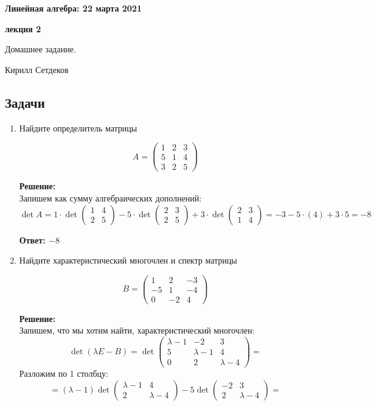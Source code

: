 \documentclass[a4paper,12pt]{article}
\newcounter{z}
\renewcommand{\date}{{\bf 22 марта 2021}}
\newcommand{\HSEhat}{
\vspace*{-0pt}
\noindent
\setcounter{z}{0}


{\bf \phantom{\date}  \large \hfill Линейная алгебра: \hfill \normalsize \date}

\vspace{5 pt}
{\bf \large \hfill  лекция 2\hfill }

\vspace{15 pt}
\centerline{ \large  Домашнее задание.}
\centerline{ \large  Кирилл Сетдеков}



\vspace*{10pt}
\setcounter{z}{0}

}
\begin{document}
\HSEhat


\subsection*{Задачи}

\begin{enumerate}

\item  Найдите определитель матрицы

$$A=
\begin{pmatrix}
1&2&3\\
5&1&4\\
3&2&5
\end{pmatrix}
$$

\vspace{5pt}
\textbf{Решение:}\\
Запишем как сумму алгебраических дополнений:
$$\det A = 1\cdot\det \begin{pmatrix}
1&4\\
2&5
\end{pmatrix}-5\cdot\det \begin{pmatrix}
2&3\\
2&5
\end{pmatrix}+3\cdot\det \begin{pmatrix}
2&3\\
1&4
\end{pmatrix} = -3-5\cdot(4)+3\cdot5=-8$$

\textbf{Ответ: $-8$}


\item  Найдите характеристический многочлен и спектр матрицы 

$$B=
\begin{pmatrix}
1 & 2 & -3\\
-5 & 1 & -4\\
0 & -2 & 4
\end{pmatrix}
$$

\vspace{5pt}
\textbf{Решение:}\\
Запишем, что мы хотим найти, характеристический многочлен:
$$\det(\lambda E - B)= \det \begin{pmatrix}
\lambda - 1 & -2 & 3\\
5 & \lambda -1 & 4\\
0 & 2 & \lambda - 4
\end{pmatrix}=$$
Разложим по 1 столбцу:
$$=(\lambda - 1)\det\begin{pmatrix}
 \lambda -1 & 4\\
 2 & \lambda - 4
\end{pmatrix} - 5 \det \begin{pmatrix}
 -2 & 3\\
 2 & \lambda - 4
\end{pmatrix} =$$


\end{enumerate}
\end{document}

